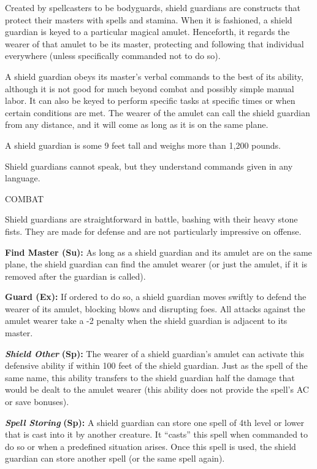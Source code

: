 \documentclass{article}
\begin{document}
Created by spellcasters to be bodyguards, shield guardians are constructs that 
protect their masters with spells and stamina. When it is fashioned, a shield guardian 
is keyed to a particular magical amulet. Henceforth, it regards the wearer of that 
amulet to be its master, protecting and following that individual everywhere (unless 
specifically commanded not to do so).

A shield guardian obeys its master's verbal commands to the best of its ability, 
although it is not good for much beyond combat and possibly simple manual labor. 
It can also be keyed to perform specific tasks at specific times or when certain 
conditions are met. The wearer of the amulet can call the shield guardian from 
any distance, and it will come as long as it is on the same plane.

A shield guardian is some 9 feet tall and weighs more than 1,200 pounds.

Shield guardians cannot speak, but they understand commands given in any language.

COMBAT

Shield guardians are straightforward in battle, bashing with their heavy stone 
fists. They are made for defense and are not particularly impressive on offense.

\textbf{Find Master (Su):} As long as a shield guardian and its amulet are on the 
same plane, the shield guardian can find the amulet wearer (or just the amulet, 
if it is removed after the guardian is called).

\textbf{Guard (Ex):} If ordered to do so, a shield guardian moves swiftly to defend 
the wearer of its amulet, blocking blows and disrupting foes. All attacks against 
the amulet wearer take a -2 penalty when the shield guardian is adjacent to its 
master.

\textit{\textbf{Shield Other }}\textbf{(Sp):} The wearer of a shield guardian's 
amulet can activate this defensive ability if within 100 feet of the shield guardian. 
Just as the spell of the same name, this ability transfers to the shield guardian 
half the damage that would be dealt to the amulet wearer (this ability does not 
provide the spell's AC or save bonuses).

\textit{\textbf{Spell Storing }}\textbf{(Sp):} A shield guardian can store one 
spell of 4th level or lower that is cast into it by another creature. It ``casts'' 
this spell when commanded to do so or when a predefined situation arises. Once 
this spell is used, the shield guardian can store another spell (or the same spell 
again).
\end{document}
